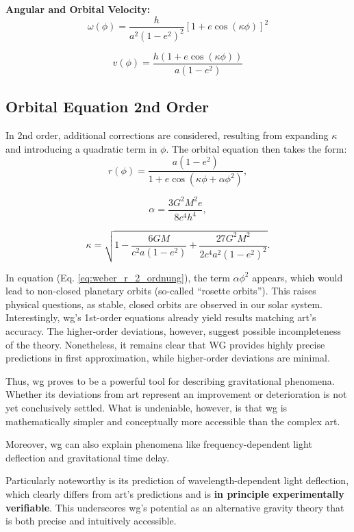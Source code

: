 \textbf{Angular and Orbital Velocity:}
\begin{equation}
    \omega(\phi) = \frac{h}{a^2(1 - e^2)^2} \left[1 + e \cos(\kappa \phi)\right]^2    
\end{equation}

\begin{equation}
    v(\phi) = \frac{h \left(1 + e \cos(\kappa \phi)\right)}{a(1 - e^2)}
\end{equation}

\subsection{Orbital Equation 2nd Order}
In 2nd order, additional corrections are considered, resulting from expanding $\kappa$ and introducing a quadratic term in $\phi$.
The orbital equation then takes the form:
\begin{equation}
    \label{eq:weber_r_2_ordnung}
    r(\phi) = \frac{a(1 - e^2)}{1 + e \cos(\kappa \phi + \alpha \phi^2)},
\end{equation}

\begin{equation}
\alpha = \frac{3G^2 M^2 e}{8c^4 h^4},
\end{equation}

\begin{equation}
\kappa = \sqrt{1 - \frac{6GM}{c^2 a(1 - e^2)} + \frac{27G^2 M^2}{2c^4 a^2 (1 - e^2)^2}}.
\end{equation}

In equation (Eq. \ref{eq:weber_r_2_ordnung}), the term $\alpha \phi^2$ appears, which would lead to non-closed planetary orbits (so-called \enquote{rosette orbits}).
This raises physical questions, as stable, closed orbits are observed in our solar system. Interestingly, \gls{wg}'s 1st-order equations already yield results
matching \gls{art}'s accuracy. The higher-order deviations, however, suggest possible incompleteness of the theory. Nonetheless, it remains clear that WG provides
highly precise predictions in first approximation, while higher-order deviations are minimal.

Thus, \gls{wg} proves to be a powerful tool for describing gravitational phenomena. Whether its deviations from \gls{art} represent an improvement or deterioration
is not yet conclusively settled. What is undeniable, however, is that \gls{wg} is mathematically simpler and conceptually more accessible than the complex \gls{art}.

Moreover, \gls{wg} can also explain phenomena like frequency-dependent light deflection and gravitational time delay.

Particularly noteworthy is its prediction of
wavelength-dependent light deflection, which clearly differs from \gls{art}'s predictions and is \textbf{in principle experimentally verifiable}. This underscores \gls{wg}'s potential
as an alternative gravity theory that is both precise and intuitively accessible.